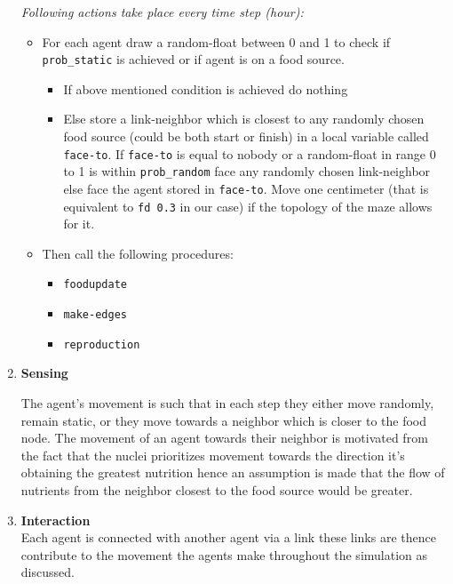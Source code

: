 \documentclass[a4paper, 12pt]{article}
\begin{document}
\begin{enumerate}
        \textit{Following actions take place every time step (hour):}
    \begin{itemize}
        \item For each agent draw a random-float between 0 and 1 to check if \texttt{prob\_static} is achieved or if agent is on a food source.
        \begin{itemize}
            \item If above mentioned condition is achieved do nothing
            \item Else store a link-neighbor which is closest to any randomly chosen food source (could be both start or finish) in a local variable called \texttt{face-to}. If \texttt{face-to} is equal to nobody or a random-float in range 0 to 1 is within \texttt{prob\_random} face any randomly chosen link-neighbor else face the agent stored in \texttt{face-to}. Move one centimeter (that is equivalent to \texttt{fd 0.3} in our case) if the topology of the maze allows for it.
        \end{itemize}
        \item Then call the following procedures: 
        \begin{itemize}
            \item \texttt{foodupdate}
            \item \texttt{make-edges}
            \item \texttt{reproduction}
        \end{itemize}
    \end{itemize}
    
    \item \textbf{Sensing}\par
    The agent's movement is such that in each step they either move randomly, remain static, or they move towards a neighbor which is closer to the food node. The movement of an agent towards their neighbor is motivated from the fact that the nuclei prioritizes movement towards the direction it's obtaining the greatest nutrition hence an assumption is made that the flow of nutrients from the neighbor closest to the food source would be greater.
    
   \item \textbf{Interaction}\\
   Each agent is connected with another agent via a link these links are thence contribute to the movement the agents make throughout the simulation as discussed.
    

\end{enumerate}
\end{document}
